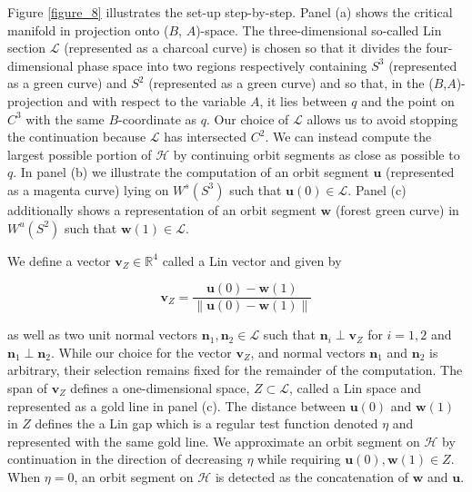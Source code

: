 \documentclass{ws-ijbc}
\begin{document}
Figure \ref{figure_8} illustrates the set-up step-by-step.  Panel (a) shows the critical manifold in projection onto ($B$, $A$)-space.  The three-dimensional so-called Lin section $\mathscr{L}$ (represented as a charcoal curve) is chosen so that it divides the four-dimensional phase space into two regions respectively containing $S^3$ (represented as a green curve) and $S^2$ (represented as a green curve) and so that, in the ($B$,$A$)-projection and with respect to the variable $A$, it lies between $q$ and the point on $C^3$ with the same $B$-coordinate as $q$.  Our choice of $\mathscr{L}$ allows us to avoid stopping the continuation because $\mathscr{L}$ has intersected $C^2$.  We can instead compute the largest possible portion of $\mathscr{H}$ by continuing orbit segments as close as possible to $q$.  In panel (b) we illustrate the computation of an orbit segment $\mathbf{u}$ (represented as a magenta curve) lying on $W^s(S^3)$ such that $\mathbf{u}(0) \in \mathscr{L}$.  Panel (c) additionally shows a representation of an orbit segment $\mathbf{w}$ (forest green curve) in $W^u(S^2)$ such that  $\mathbf{w}(1) \in \mathscr{L}$.

We define a vector $\mathbf{v}_Z \in \mathbb{R}^4$ called a Lin vector and given by 

	\begin{equation}
		\mathbf{v}_Z = \frac{\mathbf{u}(0) - \mathbf{w}(1)}{\left\lVert \mathbf{u}(0) - \mathbf{w}(1) \right\lVert}
		\label{Lin_vector}
	\end{equation}
	
\noindent	
as well as two unit normal vectors $\mathbf{n}_1, \mathbf{n}_2 \in \mathscr{L}$ such that $\mathbf{n}_i \perp \mathbf{v}_Z$ for $i=1,2$ and $\mathbf{n}_1 \perp \mathbf{n}_2$.  While our choice for the vector $\mathbf{v}_Z$, and normal vectors $\mathbf{n}_1$ and $\mathbf{n}_2$ is arbitrary, their selection remains fixed for the remainder of the computation.  The span of $\mathbf{v}_Z$ defines a one-dimensional space, $Z \subset \mathscr{L}$, called a Lin space and represented as a gold line in panel (c).  The distance between $\mathbf{u}(0)$ and $\mathbf{w}(1)$ in $Z$ defines the a Lin gap which is a regular test function denoted $\eta$ and represented with the same gold line.  We approximate an orbit segment on $\mathscr{H}$ by continuation in the direction of decreasing $\eta$ while requiring $\mathbf{u}(0), \mathbf{w}(1) \in Z$.  When  $\eta = 0$, an orbit segment on $\mathscr{H}$ is detected as the concatenation of $\mathbf{w}$ and $\mathbf{u}$.
\end{document}
